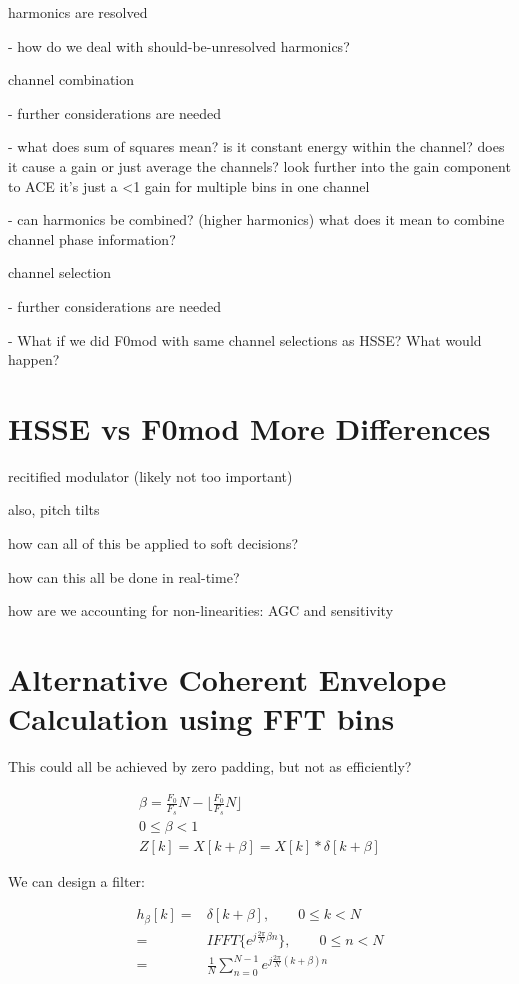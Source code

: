 \documentclass [11pt, proquest] {uwthesis}[2015/03/03]
\begin{document}
harmonics are resolved

 - how do we deal with should-be-unresolved harmonics?

channel combination

 - further considerations are needed

 - what does sum of squares mean? is it constant energy within the channel?  does it cause a gain or just average the channels?  look further into the gain component to ACE
 	it's just a <1 gain for multiple bins in one channel

 - can harmonics be combined? (higher harmonics) what does it mean to combine channel phase information?

channel selection

 - further considerations are needed

 - What if we did F0mod with same channel selections as HSSE?  What would happen?

\section{HSSE vs F0mod More Differences}

recitified modulator (likely not too important)

also, pitch tilts

how can all of this be applied to soft decisions?

how can this all be done in real-time?

how are we accounting for non-linearities: AGC and sensitivity




\section{Alternative Coherent Envelope Calculation using FFT bins}

This could all be achieved by zero padding, but not as efficiently?

\begin{align}
\beta = \frac{F_0}{F_s}N - \Big\lfloor \frac{F_0}{F_s}N \Big\rfloor \\
0 \leq \beta < 1 \nonumber \\
Z[k] = X[k + \beta] = X[k] * \delta[k + \beta] \nonumber
\end{align}

We can design a filter:

\begin{align}
h_{\beta}[k] =& \delta[k + \beta], \qquad 0 \leq k < N  \nonumber \\
=& IFFT\{e^{j\frac{2\pi}{N} \beta n} \}, \qquad 0 \leq n < N \nonumber \\
=& \frac{1}{N} \sum_{n=0}^{N-1} e^{j\frac{2\pi}{N}(k + \beta)n}
\end{align}
\end{document}
